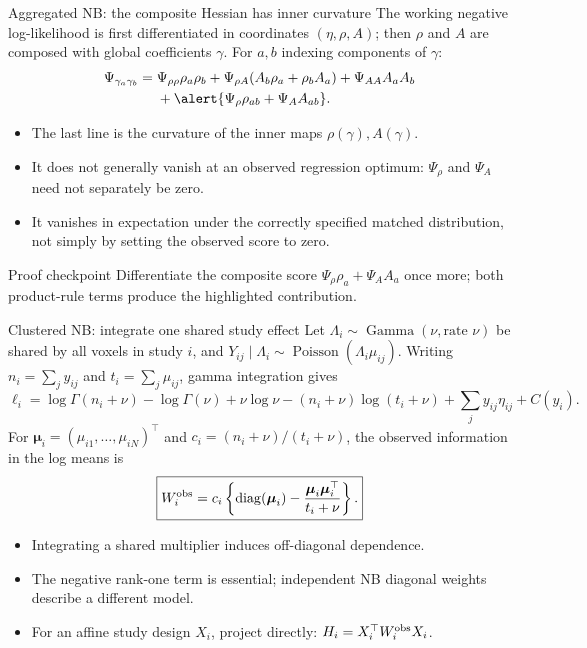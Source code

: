 \documentclass[aspectratio=169,10pt]{beamer}
\newcommand{\diag}{\operatorname{diag}}
\newcommand{\bmu}{\boldsymbol{\mu}}
\begin{document}
\begin{frame}{Aggregated NB: the composite Hessian has inner curvature}
The working negative log-likelihood is first differentiated in coordinates
$(\eta,\rho,A)$; then $\rho$ and $A$ are composed with global coefficients
$\gamma$.
For $a,b$ indexing components of $\gamma$:
\[
\begin{aligned}
\Psi_{\gamma_a\gamma_b}={}&
\Psi_{\rho\rho}\rho_a\rho_b
+\Psi_{\rho A}(A_b\rho_a+\rho_bA_a)
+\Psi_{AA}A_aA_b\\
&+\alert{\Psi_\rho\rho_{ab}+\Psi_AA_{ab}}.
\end{aligned}
\]
\begin{itemize}
  \item The last line is the curvature of the inner maps
        $\rho(\gamma),A(\gamma)$.
  \item It does not generally vanish at an observed regression optimum:
        $\Psi_\rho$ and $\Psi_A$ need not separately be zero.
  \item It vanishes in expectation under the correctly specified matched
        distribution, not simply by setting the observed score to zero.
\end{itemize}
\begin{block}{Proof checkpoint}
Differentiate the composite score $\Psi_\rho\rho_a+\Psi_AA_a$ once more;
both product-rule terms produce the highlighted contribution.
\end{block}
\end{frame}

\begin{frame}{Clustered NB: integrate one shared study effect}
Let $\Lambda_i\sim\operatorname{Gamma}(\nu,\text{rate }\nu)$ be shared by all
voxels in study $i$, and
$Y_{ij}\mid\Lambda_i\sim\operatorname{Poisson}(\Lambda_i\mu_{ij})$.
Writing $n_i=\sum_jy_{ij}$ and $t_i=\sum_j\mu_{ij}$, gamma integration gives
\[
\ell_i=\log\Gamma(n_i+\nu)-\log\Gamma(\nu)+\nu\log\nu
-(n_i+\nu)\log(t_i+\nu)
+\sum_j y_{ij}\eta_{ij}+C(y_i).
\]
For $\bmu_i=(\mu_{i1},\ldots,\mu_{iN})^\top$ and
$c_i=(n_i+\nu)/(t_i+\nu)$, the observed information in the log means is
\[
\boxed{W_i^{\rm obs}
=c_i\left\{\diag(\bmu_i)
-\frac{\bmu_i\bmu_i^\top}{t_i+\nu}\right\}.}
\]
\begin{itemize}
  \item Integrating a shared multiplier induces off-diagonal dependence.
  \item The negative rank-one term is essential; independent NB diagonal
        weights describe a different model.
  \item For an affine study design $X_i$, project directly:
        $H_i=X_i^\top W_i^{\rm obs}X_i$.
\end{itemize}
\end{frame}
\end{document}
